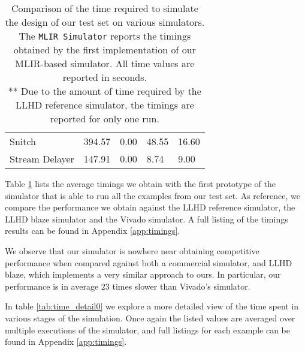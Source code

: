 \begin{table}
{\begin{tabular}{lllll}
            Snitch          & 394.57                    & 0.00                      & 48.55                     & 16.60               \\
            Stream Delayer  & 147.91                    & 0.00                      & 8.74                      & 9.00                \\
            \bottomrule
        \end{tabular}
    }
    \caption[Comparison of simulation timings.]{Comparison of the time required to simulate the design of our test set on various simulators. The \texttt{MLIR Simulator} reports the timings obtained by the first implementation of our MLIR-based simulator. All time values are reported in seconds. \\ ** Due to the amount of time required by the LLHD reference simulator, the timings are reported for only one run.}
    \label{tab:timings_compare}
\end{table}

Table \ref{tab:timings_compare} lists the average timings we obtain with the first prototype of the simulator that is able to run all the examples from our test set. As reference, we compare the performance we obtain against the LLHD reference simulator, the LLHD blaze simulator and the Vivado simulator. A full listing of the timings results can be found in Appendix \ref{app:timings}.


We observe that our simulator is nowhere near obtaining competitive performance when compared against both a commercial simulator, and LLHD blaze, which implements a very similar approach to ours. In particular, our performance is in average $23$ times slower than Vivado's simulator.

In table \ref{tab:time_detail0} we explore a more detailed view of the time spent in various stages of the simulation. Once again the listed values are averaged over multiple executions of the simulator, and full listings for each example can be found in Appendix \ref{app:timings}.

